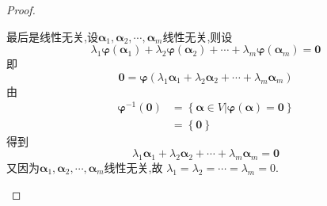 {\begin{proof}
\begin{enumerate}[label=\arabic*)]
                  最后是线性无关,设$\bm{\alpha}_1,\bm{\alpha}_2,\cdots,\bm{\alpha}_m$线性无关,则设
                  \[\lambda_1\bm{\varphi}\left(\bm{\alpha}_1\right)+\lambda_2\bm{\varphi}\left(\bm{\alpha}_2\right)+\cdots+\lambda_m\bm{\varphi}\left(\bm{\alpha}_m
                      \right)=\bm{0}\]即
                  \[
                      \bm{0}=\bm{\varphi}\left(\lambda_1\bm{\alpha}_1+\lambda_2\bm{\alpha}_2+\cdots
                      +\lambda_m\bm{\alpha}_m\right)
                  \]
                  由\begin{align*}
                      \bm{\varphi}^{-1}\left(\bm{0}\right) & =
                      \left\{\bm{\alpha}\in V\big| \bm{\varphi}\left(\bm{\alpha}\right)=\bm{0}\right\} \\
                                                           & =\left\{\bm{0}\right\}
                  \end{align*}
                  得到
                  \[
                      \lambda_1\bm{\alpha}_1+\lambda_2\bm{\alpha}_2+\cdots
                      +\lambda_m\bm{\alpha}_m=\bm{0}
                  \]
                  又因为$\bm{\alpha}_1,\bm{\alpha}_2,\cdots,\bm{\alpha}_m$线性无关,故
                  $\lambda_1=\lambda_2=\cdots=\lambda_m=0.$\qedhere
        \end{enumerate}
    \end{proof}
}
